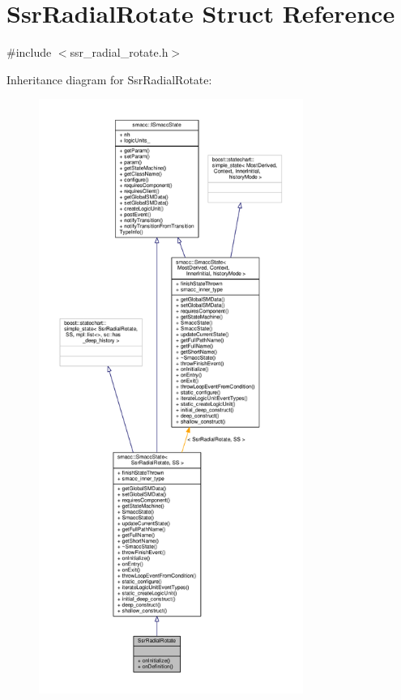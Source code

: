 \hypertarget{structSsrRadialRotate}{}\section{Ssr\+Radial\+Rotate Struct Reference}
\label{structSsrRadialRotate}


{\ttfamily \#include $<$ssr\+\_\+radial\+\_\+rotate.\+h$>$}



Inheritance diagram for Ssr\+Radial\+Rotate\+:
\nopagebreak
\begin{figure}[H]
\begin{center}
\leavevmode
\includegraphics[height=550pt]{structSsrRadialRotate__inherit__graph}
\end{center}
\end{figure}


